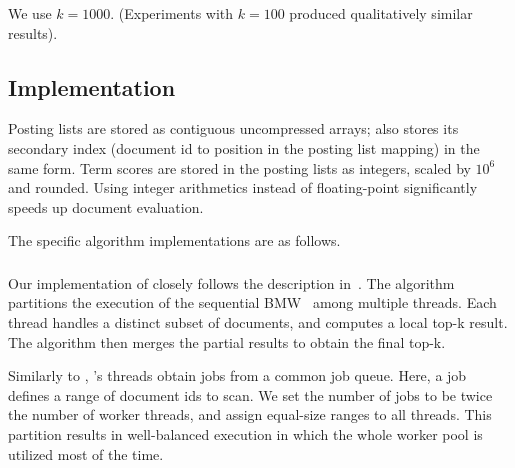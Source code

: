 We use  $k=1000$. 
(Experiments with $k=100$ produced qualitatively similar results).


\subsection{Implementation}
\label{ssec:implementation}

Posting lists are stored as contiguous uncompressed arrays;  {\pRA} also stores 
its secondary index (document id to position in the posting list mapping) in the same form. 
Term scores are stored in the posting lists as integers, scaled by $10^6$ and rounded. 
Using integer arithmetics instead of floating-point significantly speeds up document evaluation. 

The specific algorithm implementations are as follows.

\subsubsection{\pBMW}
Our implementation of {\pBMW} closely follows the description in~\cite{rojas2013distributing}. The algorithm partitions the execution of the 
sequential BMW~\cite{Ding:2011} among multiple threads. Each thread handles a distinct subset of documents, and computes a local top-k 
result. The algorithm then merges the partial results to obtain the final top-k. 

Similarly to \alg, \pBMW's threads obtain jobs from a common job queue. Here, a job defines a range of document ids to scan. 
We set the number of jobs to be twice the number of worker threads, and assign equal-size ranges to all threads.  
This partition results in well-balanced execution in which the whole worker pool is utilized 
most of the time. 

